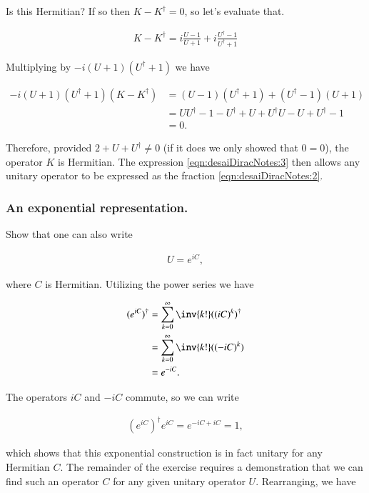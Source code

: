 Is this Hermitian?  If so then $K - K^\dagger = 0$, so let's evaluate that.

\begin{align*}
K - K^\dagger = i \frac{ U - 1 }{U + 1} + i \frac{ U^\dagger - 1 }{U^\dagger + 1}
\end{align*}

Multiplying by $-i(U+1)(U^\dagger+1)$ we have

\begin{align*}
-i(U+1)(U^\dagger+1)(K - K^\dagger) 
&= ( U - 1 )(U^\dagger + 1) + ( U^\dagger - 1 )(U + 1) \\
&= U U^\dagger - 1 - U^\dagger + U     + U^\dagger U - U + U^\dagger - 1 \\
&= 0.
\end{align*}

Therefore, provided $2 + U + U^\dagger \ne 0$ (if it does we only showed that $0 = 0$), the operator $K$ is Hermitian.  The expression \ref{eqn:desaiDiracNotes:3} then allows any unitary operator to be expressed as the fraction \ref{eqn:desaiDiracNotes:2}.

\subsubsection{An exponential representation.}

Show that one can also write

\begin{align*}
U = e^{i C},
\end{align*}

where $C$ is Hermitian.  Utilizing the power series we have

\begin{align*}
(e^{iC})^\dagger
&= 
\sum_{k=0}^\infty \inv{k!} ((iC)^k)^\dagger \\
&= 
\sum_{k=0}^\infty \inv{k!} ((-iC)^k) \\
&= 
e^{-iC}.
\end{align*}

The operators $i C$ and $-i C$ commute, so we can write

\begin{align*}
(e^{iC})^\dagger e^{iC} = e^{ -iC + iC } = 1,
\end{align*}

which shows that this exponential construction is in fact unitary for any Hermitian $C$.  The remainder of the exercise requires a demonstration that we can find such an operator $C$ for any given unitary operator $U$.  Rearranging, we have

